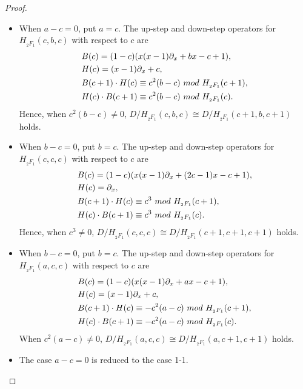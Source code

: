 \documentclass[10pt,a4paper]{amsart}
\def\Hg{H_{{}_2F_1}}
\def\aalpha{a}
\def\bbeta{b}
\def\ggamma{c}
\def\p{\partial}
\begin{document}
\begin{proof}
\begin{itemize}
\item[(1)] When $\aalpha - \ggamma = 0$,
put $\aalpha = \ggamma$.
The up-step and down-step operators
for $\Hg(\ggamma, \bbeta, \ggamma)$ with respect to $\ggamma$ 
are
\begin{align*}
&B(\ggamma) = (1-\ggamma)(x(x-1) \p_x +\bbeta x - \ggamma + 1), \\
&H(\ggamma) = (x-1) \p_x + \ggamma, \\
&B(\ggamma+1) \cdot H(\ggamma) \equiv \ggamma^2 (\bbeta - \ggamma) ~{\rm mod}~ \Hg(\ggamma+1), \\
&H(\ggamma) \cdot B(\ggamma+1) \equiv \ggamma^2 (\bbeta - \ggamma) ~{\rm mod}~ \Hg(\ggamma).
\end{align*}
Hence, when $\ggamma^2 (\bbeta - \ggamma) \neq 0$,
$D/\Hg(\ggamma, \bbeta, \ggamma) \cong D/\Hg(\ggamma+1, \bbeta, \ggamma+1)$
holds. 

\item[(1-1)] When $\bbeta - \ggamma = 0$,
put $\bbeta = \ggamma$.
The up-step and down-step operators for  $\Hg(\ggamma, \ggamma, \ggamma)$
with respect to $\ggamma$ are
\begin{align*}
&B(\ggamma) = (1-\ggamma)(x(x-1) \p_x + (2\ggamma-1)x - \ggamma+1), \\
&H(\ggamma) = \p_x, \\
&B(\ggamma+1) \cdot H(\ggamma) \equiv \ggamma^3 ~{\rm mod}~ \Hg(\ggamma+1), \\
&H(\ggamma) \cdot B(\ggamma+1) \equiv \ggamma^3  ~{\rm mod}~ \Hg(\ggamma).
\end{align*}
Hence, when $\ggamma^3 \neq 0$,
$D/\Hg(\ggamma, \ggamma, \ggamma) \cong D/\Hg(\ggamma+1, \ggamma+1, \ggamma+1)$
holds.

\item[(2)] When $\bbeta - \ggamma = 0$,
put $\bbeta = \ggamma$.
The up-step and down-step operators for $\Hg(\aalpha, \ggamma, \ggamma)$
with respect to $\ggamma$ are
\begin{align*}
&B(\ggamma) = (1-\ggamma)(x(x-1) \p_x +\aalpha x - \ggamma + 1), \\
&H(\ggamma) = (x-1) \p_x + \ggamma, \\ 
&B(\ggamma+1) \cdot H(\ggamma) \equiv -\ggamma^2 (\aalpha - \ggamma) ~{\rm mod}~ \Hg(\ggamma+1), \\
&H(\ggamma) \cdot B(\ggamma+1) \equiv -\ggamma^2 (\aalpha - \ggamma) ~{\rm mod}~ \Hg(\ggamma).
\end{align*}
When $\ggamma^2 (\aalpha - \ggamma) \neq 0$,
$D/\Hg(\aalpha, \ggamma, \ggamma) \cong D/\Hg(\aalpha, \ggamma+1, \ggamma+1)$
holds. 

\item[(2-1)] The case $\aalpha - \ggamma = 0$ 
is reduced to the case 1-1.
\end{itemize}
\end{proof}
\end{document}
